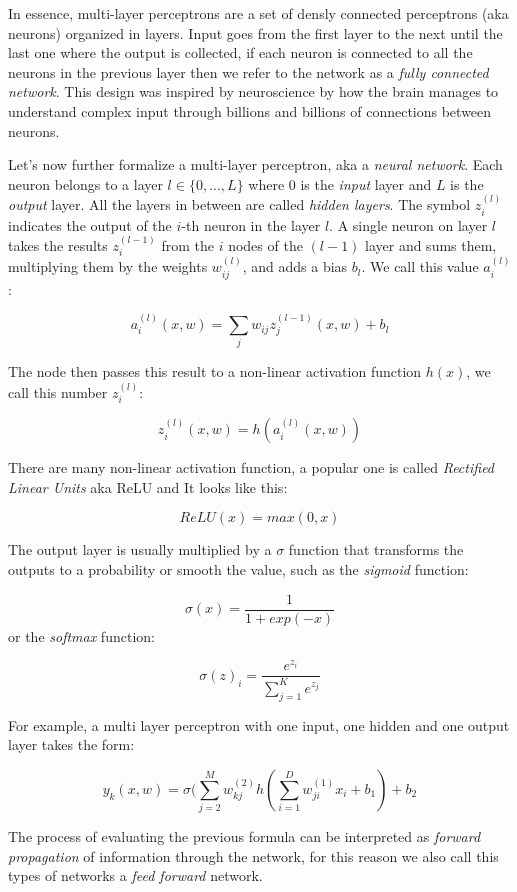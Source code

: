 \documentclass[11pt]{article}
\begin{document}
In essence, multi-layer perceptrons are a set of densly connected
perceptrons (aka neurons) organized in layers. Input goes from the first
layer to the next until the last one where the output is collected, if
each neuron is connected to all the neurons in the previous layer then
we refer to the network as a \emph{fully connected network}. This design
was inspired by neuroscience by how the brain manages to understand
complex input through billions and billions of connections between
neurons.

Let's now further formalize a multi-layer perceptron, aka a \emph{neural
network}. Each neuron belongs to a layer \(l\in \{ 0, ..., L \}\) where
\(0\) is the \emph{input} layer and \(L\) is the \emph{output} layer.
All the layers in between are called \emph{hidden layers}. The symbol
\(z^{(l)}_i\) indicates the output of the \(i\)-th neuron in the layer
\(l\). A single neuron on layer \(l\) takes the results
\(z_{i}^{(l-1)}\) from the \(i\) nodes of the \((l-1)\) layer and sums
them, multiplying them by the weights \(w_{ij}^{(l)}\), and adds a bias
\(b_l\). We call this value \(a_i^{(l)}\):

\[a_{i}^{(l)}(x, w)=\sum_j w_{ij}z_j^{(l-1)}(x, w)+b_l\]

The node then passes this result to a non-linear activation function
\(h(x)\), we call this number \(z_{i}^{(l)}\):

\[z_i^{(l)}(x, w)=h(a_i^{(l)}(x, w))\]

There are many non-linear activation function, a popular one is called
\emph{Rectified Linear Units} aka ReLU and It looks like this:

\[ReLU(x)=max(0, x)\]

The output layer is usually multiplied by a \(\sigma\) function that
transforms the outputs to a probability or smooth the value, such as the
\emph{sigmoid} function:

\[\sigma(x)= \frac{1}{1+exp(-x)}\] or the \emph{softmax} function:

\[\sigma (z)_i = \frac{e^{z_i}}{\sum_{j=1}^{K} e^{z_j}}\]

For example, a multi layer perceptron with one input, one hidden and one
output layer takes the form:

\[y_k(x, w)=\sigma (\sum_{j=2}^M w_{kj}^{(2)}h(\sum_{i=1}^D w_{ji}^{(1)}x_i + b_1) + b_{2}\]

The process of evaluating the previous formula can be interpreted as
\emph{forward propagation} of information through the network, for this
reason we also call this types of networks a \emph{feed forward}
network.
\end{document}
